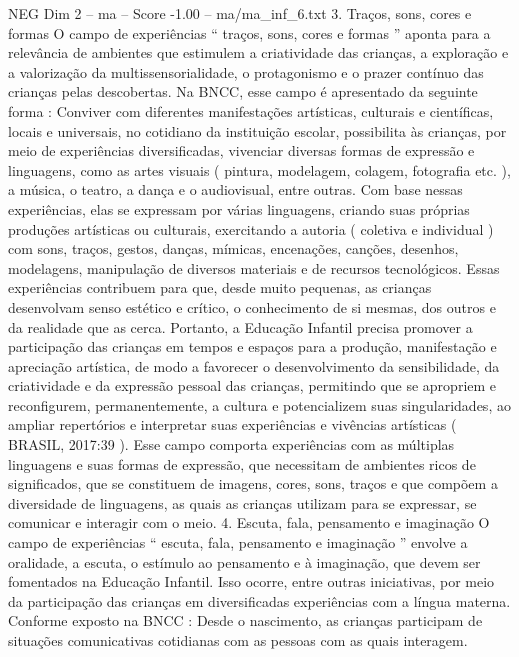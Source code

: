 \begin{textsample}{NEG Dim 2 – ma – Score -1.00 – ma/ma\_inf\_6.txt}  \label{ex:f2_neg_234}
3.
Traços, sons, cores e formas O campo de experiências “ traços, sons, cores e formas ” aponta para a relevância de ambientes que estimulem a criatividade das crianças, a exploração e a valorização da multissensorialidade, o protagonismo e o prazer contínuo das crianças pelas descobertas.
Na BNCC, esse campo é apresentado da seguinte forma : Conviver com diferentes manifestações artísticas, culturais e científicas, locais e universais, no cotidiano da instituição escolar, possibilita às crianças, por meio de experiências diversificadas, vivenciar diversas formas de expressão e linguagens, como as artes visuais ( pintura, modelagem, colagem, fotografia etc. ), a música, o teatro, a dança e o audiovisual, entre outras.
Com base nessas experiências, elas se expressam por várias linguagens, criando suas próprias produções artísticas ou culturais, exercitando a autoria ( coletiva e individual ) com sons, traços, gestos, danças, mímicas, encenações, canções, desenhos, modelagens, manipulação de diversos materiais e de recursos tecnológicos.
Essas experiências contribuem para que, desde muito pequenas, as crianças desenvolvam senso estético e crítico, o conhecimento de si mesmas, dos outros e da realidade que as cerca.
Portanto, a Educação Infantil precisa promover a participação das crianças em tempos e espaços para a produção, manifestação e apreciação artística, de modo a favorecer o desenvolvimento da sensibilidade, da criatividade e da expressão pessoal das crianças, permitindo que se apropriem e reconfigurem, permanentemente, a cultura e potencializem suas singularidades, ao ampliar repertórios e interpretar suas experiências e vivências artísticas ( BRASIL, 2017:39 ).
Esse campo comporta experiências com as múltiplas linguagens e suas formas de expressão, que necessitam de ambientes ricos de significados, que se constituem de imagens, cores, sons, traços e que compõem a diversidade de linguagens, as quais as crianças utilizam para se expressar, se comunicar e interagir com o meio. 4.
Escuta, fala, pensamento e imaginação O campo de experiências “ escuta, fala, pensamento e imaginação ” envolve a oralidade, a escuta, o estímulo ao pensamento e à imaginação, que devem ser fomentados na Educação Infantil.
Isso ocorre, entre outras iniciativas, por meio da participação das crianças em diversificadas experiências com a língua materna.
Conforme exposto na BNCC : Desde o nascimento, as crianças participam de situações comunicativas cotidianas com as pessoas com as quais interagem.

\end{textsample}
